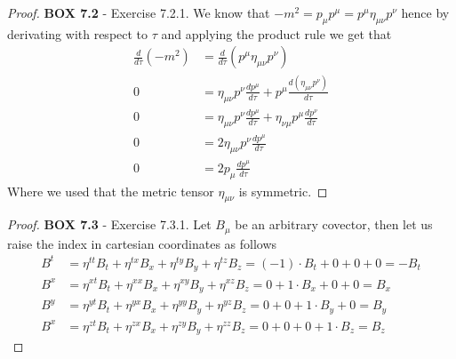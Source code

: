 \documentclass[11pt]{article}
\theoremstyle{definition}
\begin{document}
\begin{proof}{\textbf{BOX 7.2} - Exercise 7.2.1.}
    We know that $-m^2 = p_\mu p^\mu = p^\mu \eta_{\mu\nu}p^\nu$ hence
    by derivating with respect to $\tau$ and applying the product rule
    we get that
    \begin{align*}
        \frac{d}{d\tau}(-m^2) &= \frac{d}{d\tau}(p^\mu \eta_{\mu\nu}p^\nu)\\
        0 &= \eta_{\mu\nu}p^\nu \frac{dp^\mu}{d\tau}
        + p^\mu \frac{d(\eta_{\mu\nu}p^\nu)}{d\tau}\\
        0 &= \eta_{\mu\nu}p^\nu \frac{dp^\mu}{d\tau}
        + \eta_{\nu\mu}p^\mu \frac{dp^\nu}{d\tau}\\
        0 &= 2\eta_{\mu\nu}p^\nu \frac{dp^\mu}{d\tau}\\
        0 &= 2p_\mu \frac{dp^\mu}{d\tau} 
    \end{align*}
    Where we used that the metric tensor $\eta_{\mu\nu}$ is symmetric.
\end{proof}
\begin{proof}{\textbf{BOX 7.3} - Exercise 7.3.1.}
    Let $B_\mu$ be an arbitrary covector, then let us raise the index
    in cartesian coordinates as follows
    \begin{align*}
        B^t &= \eta^{tt}B_t + \eta^{tx}B_x + \eta^{ty}B_y + \eta^{tz}B_z
            = (-1)\cdot B_t + 0 + 0 + 0 = -B_t\\
        B^x &= \eta^{xt}B_t + \eta^{xx}B_x + \eta^{xy}B_y + \eta^{xz}B_z
            = 0 + 1\cdot B_x + 0 + 0 = B_x\\
        B^y &= \eta^{yt}B_t + \eta^{yx}B_x + \eta^{yy}B_y + \eta^{yz}B_z
            = 0 + 0 + 1\cdot B_y + 0 = B_y\\
        B^x &= \eta^{zt}B_t + \eta^{zx}B_x + \eta^{zy}B_y + \eta^{zz}B_z
            = 0 + 0 + 0 + 1\cdot B_z = B_z
        \end{align*}
\end{proof}
\cleardoublepage
\end{document}
